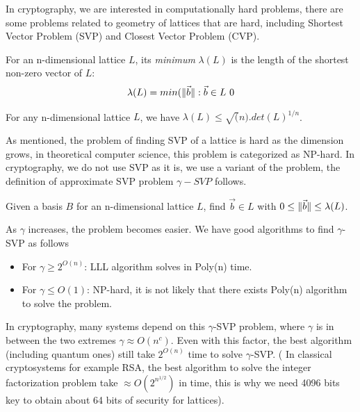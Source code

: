 In cryptography, we are interested in computationally hard problems, there are
some problems related to geometry of lattices that are hard, including Shortest
Vector Problem (SVP) and Closest Vector Problem (CVP).
\begin{definition}
  For an n-dimensional lattice $L$, its \emph{minimum} $\lambda(L)$ is the
  length of the shortest non-zero vector of $L$:
  \[
    \lambda(L) = min(\Vert \vec{b} \Vert: \vec{b} \in L \ 0
  \]
  \label{def:minLattice}
\end{definition}
\begin{theorem}
   For any n-dimensional lattice $L$, we have
  $\lambda(L) \leq \sqrt(n).det(L)^{1/n}$.
  \label{the:minkowski1}
\end{theorem}
As mentioned, the problem of finding SVP of a lattice is hard as the dimension
grows, in theoretical computer science, this problem is categorized as
NP-hard. In cryptography, we do not use SVP as it is, we use a variant of the
problem, the definition of approximate SVP problem $\gamma-SVP$ follows.
\begin{definition}
   Given a basis $B$ for an n-dimensional lattice $L$,
  find $\vec{b} \in L$ with $0 \leq \Vert \vec{b} \Vert \leq \lambda(L)$.
  \label{def:gammaSVP}
\end{definition}
As $\gamma$ increases, the problem becomes easier. We have good algorithms to
find $\gamma$-SVP as follows
\begin{itemize}
\item For $\gamma \geq 2^{O(n)}$: LLL algorithm solves in Poly(n) time.
\item For $\gamma \leq O(1)$: NP-hard, it is not likely that there exists
  Poly(n) algorithm to solve the problem.
\end{itemize}
In cryptography, many systems depend on this $\gamma$-SVP problem, where
$\gamma$ is in between the two extremes $\gamma \approx O(n^c)$. Even with this
factor, the best algorithm (including quantum ones) still take $2^{O(n)}$ time
to solve $\gamma$-SVP. ( In classical cryptosystems for example RSA, the best
algorithm to solve the integer factorization problem take
$\approx O(2^{n^{1/2}})$ in time, this is why we need 4096 bits key to obtain
about 64 bits of security for lattices).

